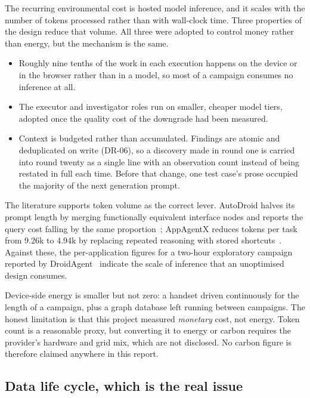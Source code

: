 The recurring environmental cost is hosted model inference, and it scales with
the number of tokens processed rather than with wall-clock time. Three
properties of the design reduce that volume. All three were adopted to control
money rather than energy, but the mechanism is the same.

\begin{itemize}[leftmargin=1.6em]
  \item Roughly nine tenths of the work in each execution happens on the device
    or in the browser rather than in a model, so most of a campaign consumes no
    inference at all.
  \item The executor and investigator roles run on smaller, cheaper model tiers,
    adopted once the quality cost of the downgrade had been measured.
  \item Context is budgeted rather than accumulated. Findings are atomic and
    deduplicated on write (DR-06), so a discovery made in round one is carried
    into round twenty as a single line with an observation count instead of
    being restated in full each time. Before that change, one test case's
    prose occupied the majority of the next generation prompt.
\end{itemize}

The literature supports token volume as the correct lever. AutoDroid halves its
prompt length by merging functionally equivalent interface nodes and reports
the query cost falling by the same proportion~\cite{autodroid}; AppAgentX
reduces tokens per task from 9.26k to 4.94k by replacing repeated reasoning
with stored shortcuts~\cite{appagentx}. Against these, the per-application
figures for a two-hour exploratory campaign reported by
DroidAgent~\cite{droidagent} indicate the scale of inference that an
unoptimised design consumes.

Device-side energy is smaller but not zero: a handset driven continuously for
the length of a campaign, plus a graph database left running between campaigns.
The honest limitation is that this project measured \emph{monetary} cost, not
energy. Token count is a reasonable proxy, but converting it to energy or
carbon requires the provider's hardware and grid mix, which are not disclosed.
No carbon figure is therefore claimed anywhere in this report.

\subsection*{Data life cycle, which is the real issue}

